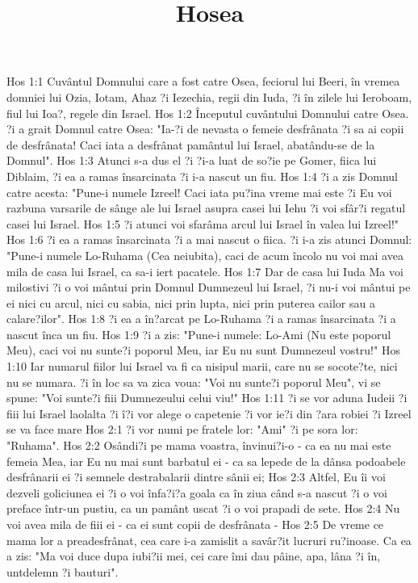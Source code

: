 

\title{Hosea}

Hos 1:1  Cuvântul Domnului care a fost catre Osea, feciorul lui Beeri, în vremea domniei lui Ozia, Iotam, Ahaz ?i Iezechia, regii din Iuda, ?i în zilele lui Ieroboam, fiul lui Ioa?, regele din Israel.
Hos 1:2  Începutul cuvântului Domnului catre Osea. ?i a grait Domnul catre Osea: "Ia-?i de nevasta o femeie desfrânata ?i sa ai copii de desfrânata! Caci iata a desfrânat pamântul lui Israel, abatându-se de la Domnul".
Hos 1:3  Atunci s-a dus el ?i ?i-a luat de so?ie pe Gomer, fiica lui Diblaim, ?i ea a ramas însarcinata ?i i-a nascut un fiu.
Hos 1:4  ?i a zis Domnul catre acesta: "Pune-i numele Izreel! Caci iata pu?ina vreme mai este ?i Eu voi razbuna varsarile de sânge ale lui Israel asupra casei lui Iehu ?i voi sfâr?i regatul casei lui Israel.
Hos 1:5  ?i atunci voi sfarâma arcul lui Israel în valea lui Izreel!"
Hos 1:6  ?i ea a ramas însarcinata ?i a mai nascut o fiica. ?i i-a zis atunci Domnul: "Pune-i numele Lo-Ruhama (Cea neiubita), caci de acum încolo nu voi mai avea mila de casa lui Israel, ca sa-i iert pacatele.
Hos 1:7  Dar de casa lui Iuda Ma voi milostivi ?i o voi mântui prin Domnul Dumnezeul lui Israel, ?i nu-i voi mântui pe ei nici cu arcul, nici cu sabia, nici prin lupta, nici prin puterea cailor sau a calare?ilor".
Hos 1:8  ?i ea a în?arcat pe Lo-Ruhama ?i a ramas însarcinata ?i a nascut înca un fiu.
Hos 1:9  ?i a zis: "Pune-i numele: Lo-Ami (Nu este poporul Meu), caci voi nu sunte?i poporul Meu, iar Eu nu sunt Dumnezeul vostru!"
Hos 1:10  Iar numarul fiilor lui Israel va fi ca nisipul marii, care nu se socote?te, nici nu se numara. ?i în loc sa va zica voua: "Voi nu sunte?i poporul Meu", vi se spune: "Voi sunte?i fiii Dumnezeului celui viu!"
Hos 1:11  ?i se vor aduna Iudeii ?i fiii lui Israel laolalta ?i î?i vor alege o capetenie ?i vor ie?i din ?ara robiei ?i Izreel se va face mare
Hos 2:1  ?i vor numi pe fratele lor: "Ami" ?i pe sora lor: "Ruhama".
Hos 2:2  Osândi?i pe mama voastra, învinui?i-o - ca ea nu mai este femeia Mea, iar Eu nu mai sunt barbatul ei - ca sa lepede de la dânsa podoabele desfrânarii ei ?i semnele destrabalarii dintre sânii ei;
Hos 2:3  Altfel, Eu îi voi dezveli goliciunea ei ?i o voi înfa?i?a goala ca în ziua când s-a nascut ?i o voi preface într-un pustiu, ca un pamânt uscat ?i o voi prapadi de sete.
Hos 2:4  Nu voi avea mila de fiii ei - ca ei sunt copii de desfrânata -
Hos 2:5  De vreme ce mama lor a preadesfrânat, cea care i-a zamislit a savâr?it lucruri ru?inoase. Ca ea a zis: "Ma voi duce dupa iubi?ii mei, cei care îmi dau pâine, apa, lâna ?i în, untdelemn ?i bauturi".
